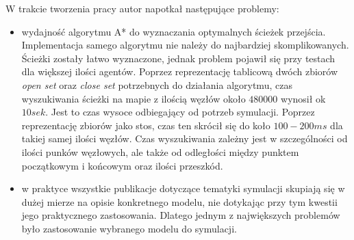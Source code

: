 W trakcie tworzenia pracy autor napotkał następujące problemy:

\begin{itemize}
\item wydajność algorytmu A* do wyznaczania optymalnych ścieżek przejścia. Implementacja samego algorytmu nie należy do najbardziej skomplikowanych. Ścieżki zostały łatwo wyznaczone, jednak problem pojawił się przy testach dla większej ilości agentów. Poprzez reprezentację tablicową dwóch zbiorów \textit{open set} oraz \textit{close set} potrzebnych do działania algorytmu, czas wyszukiwania ścieżki na mapie z ilością węzłów około $480000$ wynosił ok $10 sek$. Jest to czas wysoce odbiegający od potrzeb symulacji. Poprzez reprezentację zbiorów jako stos, czas ten skrócił się do koło $100-200 ms$ dla takiej samej ilości węzłów. Czas wyszukiwania zależny jest w szczególności od ilości punków węzłowych, ale także od odległości między punktem początkowym i końcowym oraz ilości przeszkód.

\item w praktyce wszystkie publikacje dotyczące tematyki symulacji skupiają się w dużej mierze na opisie konkretnego modelu, nie dotykając przy tym kwestii jego praktycznego zastosowania. Dlatego jednym z największych problemów było zastosowanie wybranego modelu do symulacji.
\end{itemize}
